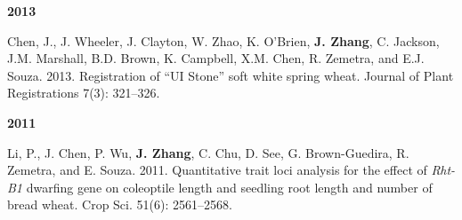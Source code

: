\begin{cventries}
{\begin{cvitems}
\end{cvitems}
}
\cventry
{\textbf{2013}}
{}
{}
{}
{
\begin{cvitems}		
	\item {Chen, J., J. Wheeler, J. Clayton, W. Zhao, K. O’Brien, \textbf{J. Zhang}, C. Jackson, J.M. Marshall, B.D. Brown, K. Campbell, X.M. Chen, R. Zemetra, and E.J. Souza. 2013. Registration of “UI Stone” soft white spring wheat. Journal of Plant Registrations 7(3): 321–326.}
\end{cvitems}
}
\cventry
{\textbf{2011}}
{}
{}
{}
{
\begin{cvitems}
\setlength\itemsep{0.5em}
	\item {Li, P., J. Chen, P. Wu, \textbf{J. Zhang}, C. Chu, D. See, G. Brown-Guedira, R. Zemetra, and E. Souza. 2011. Quantitative trait loci analysis for the effect of \emph{Rht-B1} dwarfing gene on coleoptile length and seedling root length and number of bread wheat. Crop Sci. 51(6): 2561–2568.}
\end{cvitems}
}
\end{cventries}

